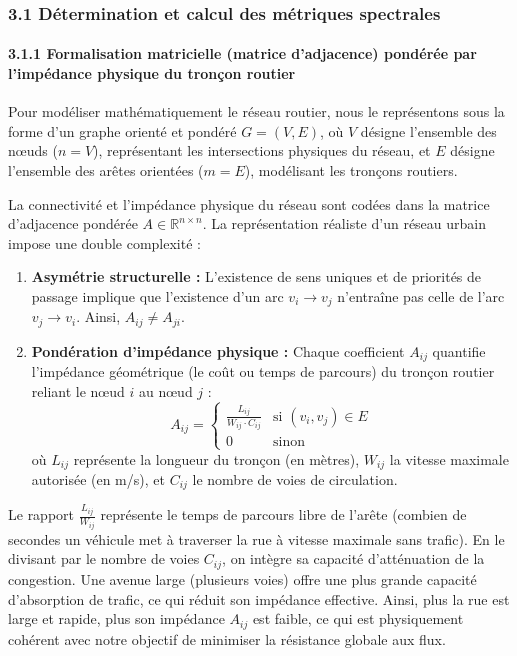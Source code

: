 \documentclass[10pt, a4paper]{article}
\providecommand{\tightlist}{}
\begin{document}
\subsubsection{3.1 Détermination et calcul des métriques
spectrales}\label{duxe9termination-et-calcul-des-muxe9triques-spectrales}

\paragraph{3.1.1 Formalisation matricielle (matrice d'adjacence)
pondérée par l'impédance physique du tronçon
routier}\label{formalisation-matricielle-matrice-dadjacence-ponduxe9ruxe9e-par-limpuxe9dance-physique-du-tronuxe7on-routier}

Pour modéliser mathématiquement le réseau routier, nous le représentons
sous la forme d'un graphe orienté et pondéré \(G = (V, E)\), où \(V\)
désigne l'ensemble des nœuds (\(n = V\)), représentant les intersections
physiques du réseau, et \(E\) désigne l'ensemble des arêtes orientées
(\(m = E\)), modélisant les tronçons routiers.

La connectivité et l'impédance physique du réseau sont codées dans la
matrice d'adjacence pondérée \(A \in \mathbb{R}^{n \times n}\). La
représentation réaliste d'un réseau urbain impose une double complexité
:

\begin{enumerate}
\def\labelenumi{\arabic{enumi}.}
\tightlist
\item
  \textbf{Asymétrie structurelle :} L'existence de sens uniques et de
  priorités de passage implique que l'existence d'un arc \(v_i \to v_j\)
  n'entraîne pas celle de l'arc \(v_j \to v_i\). Ainsi,
  \(A_{ij} \neq A_{ji}\).
\item
  \textbf{Pondération d'impédance physique :} Chaque coefficient
  \(A_{ij}\) quantifie l'impédance géométrique (le coût ou temps de
  parcours) du tronçon routier reliant le nœud \(i\) au nœud \(j\) :
  \[A_{ij} = \begin{cases} \frac{L_{ij}}{W_{ij} \cdot C_{ij}} & \text{si } (v_i, v_j) \in E \\ 0 & \text{sinon} \end{cases}\]
  où \(L_{ij}\) représente la longueur du tronçon (en mètres),
  \(W_{ij}\) la vitesse maximale autorisée (en m/s), et \(C_{ij}\) le
  nombre de voies de circulation.
\end{enumerate}

Le rapport \(\frac{L_{ij}}{W_{ij}}\) représente le temps de parcours
libre de l'arête (combien de secondes un véhicule met à traverser la rue
à vitesse maximale sans trafic). En le divisant par le nombre de voies
\(C_{ij}\), on intègre sa capacité d'atténuation de la congestion. Une
avenue large (plusieurs voies) offre une plus grande capacité
d'absorption de trafic, ce qui réduit son impédance effective. Ainsi,
plus la rue est large et rapide, plus son impédance \(A_{ij}\) est
faible, ce qui est physiquement cohérent avec notre objectif de
minimiser la résistance globale aux flux.
\end{document}
